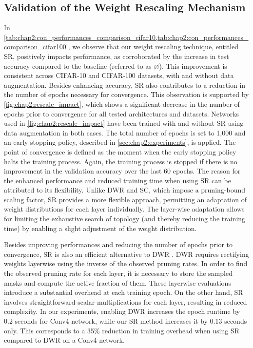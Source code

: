 \subsection{Validation of the Weight Rescaling Mechanism}
\label{sec:chap2:validation_weight_rescaling}
In
\cref{tab:chap2:con_performances_comparison_cifar10,tab:chap2:con_performances_comparison_cifar100},
we observe that our weight rescaling technique, entitled \acf{SR}, positively
impacts performance, as corroborated by the increase in test accuracy compared
to the baseline (referred to as $\varnothing$). This improvement is consistent
across CIFAR-10 and CIFAR-100 datasets, with and without data augmentation.
Besides enhancing accuracy, \ac{SR} also contributes to a reduction in the
number of epochs necessary for convergence. This observation is supported by
\cref{fig:chap2:rescale_impact}, which shows a significant decrease in the
number of epochs prior to convergence for all tested architectures and datasets.
Networks used in \cref{fig:chap2:rescale_impact} have been trained with and
without \ac{SR} using data augmentation in both cases. The total number of
epochs is set to 1,000 and an early stopping policy, described in
\cref{sec:chap2:experiments}, is applied. The point of convergence is defined as
the moment when the early stopping policy halts the training process. Again, the
training process is stopped if there is no improvement in the validation
accuracy over the last 60 epochs. The reason for the enhanced performance and
reduced training time when using \ac{SR} can be attributed to its flexibility.
Unlike \ac{DWR} and \ac{SC}, which impose a pruning-bound scaling factor,
\ac{SR} provides a more flexible approach, permitting an adaptation of weight
distributions for each layer individually. The layer-wise adaptation allows for
limiting the exhaustive search of topology (and thereby reducing the training
time) by enabling a slight adjustment of the weight distribution.

Besides improving performances and reducing the number of epochs prior to
convergence, \ac{SR} is also an efficient alternative to \acf{DWR}
\cite{DBLP:conf/nips/ZhouLLY19}. \ac{DWR} requires rectifying weights layerwise
using the inverse of the observed pruning rates. In order to find the observed
pruning rate for each layer, it is necessary to store the sampled masks and
compute the active fraction of them. These layerwise evaluations introduce a
substantial overhead at each training epoch. On the other hand, \ac{SR} involves
straightforward scalar multiplications for each layer, resulting in reduced
complexity. In our experiments, enabling \ac{DWR} increases the epoch runtime by
0.2 seconds for Conv4 network, while our \ac{SR} method increases it by 0.13
seconds only. This corresponds to a 35\% reduction in training overhead when
using \ac{SR} compared to \ac{DWR} on a Conv4 network.\\

